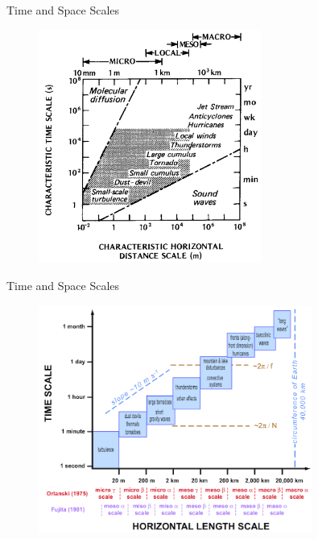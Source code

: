\begin{frame}{Time and Space Scales}

\begin{figure}
	\includegraphics[width=0.65\textwidth]{scales2.png}
\end{figure}
\end{frame}

\begin{frame}{Time and Space Scales}

\begin{figure}
	\includegraphics[width=0.8\textwidth]{scales3.png}
\end{figure}
\end{frame}

